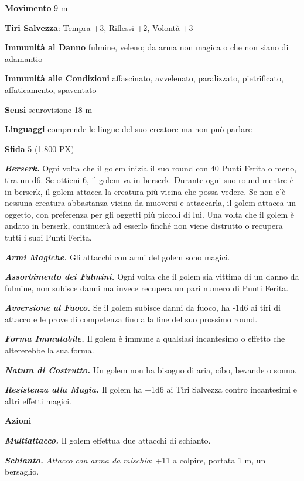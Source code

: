 \begin{multicols}{2}
	\textbf{Movimento} 9 m

	\textbf{Tiri Salvezza}: Tempra +3, Riflessi +2, Volontà +3

	\textbf{Immunità al Danno} fulmine, veleno; da arma non magica o che non siano di adamantio

	\textbf{Immunità alle Condizioni} affascinato, avvelenato, paralizzato, pietrificato, affaticamento, spaventato

	\textbf{Sensi} scurovisione 18 m

	\textbf{Linguaggi} comprende le lingue del suo creatore ma non può
	parlare

	\textbf{Sfida} 5 (1.800 PX)

	\textit{\textbf{Berserk.}} Ogni volta che il golem inizia il suo round con 40 Punti Ferita o meno, tira un d6. Se ottieni 6, il golem va in berserk. Durante ogni suo round mentre è in berserk, il golem attacca la creatura più vicina che possa vedere. Se non c'è nessuna creatura abbastanza vicina da muoversi e attaccarla, il golem attacca un oggetto, con preferenza per gli oggetti più piccoli di lui. Una volta che il golem è andato in berserk, continuerà ad esserlo finché non viene distrutto o recupera tutti i suoi Punti Ferita.

	\textit{\textbf{Armi Magiche.}} Gli attacchi con armi del golem sono magici.

	\textit{\textbf{Assorbimento dei Fulmini.}} Ogni volta che il golem sia vittima di un danno da fulmine, non subisce danni ma invece recupera un pari numero di Punti Ferita.

	\textit{\textbf{Avversione al Fuoco.}} Se il golem subisce danni da fuoco, ha -1d6 ai tiri di attacco e le prove di competenza fino alla fine del suo prossimo round.

	\textit{\textbf{Forma Immutabile.}} Il golem è immune a qualsiasi incantesimo o effetto che altererebbe la sua forma.

	\textit{\textbf{Natura di Costrutto.}} Un golem non ha bisogno di aria, cibo, bevande o sonno.

	\textit{\textbf{Resistenza alla Magia.}} Il golem ha +1d6 ai Tiri Salvezza contro incantesimi e altri effetti magici.

	\textbf{Azioni}

	\textit{\textbf{Multiattacco.}} Il golem effettua due attacchi di schianto.

	\textit{\textbf{Schianto.} Attacco con arma da mischia}: +11 a colpire, portata 1 m, un bersaglio.


\end{multicols}
